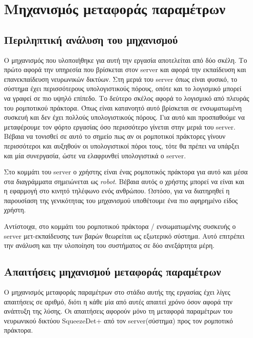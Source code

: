 \chapter{Μηχανισμός μεταφοράς παραμέτρων}


\section{Περιληπτική ανάλυση του μηχανισμού}
Ο μηχανισμός που υλοποιήθηκε για αυτή την εργασία αποτελείται από δύο σκέλη. Το πρώτο αφορά την υπηρεσία που βρίσκεται στον server και αφορά την εκπαίδευση και επανεκπαίδευση νευρωνικών δικτύων. Στη μεριά του server όπως είναι φυσικό, το σύστημα έχει περισσότερους υπολογιστικούς πόρους, οπότε και το λογισμικό μπορεί να γραφεί σε πιο υψηλό επίπεδο. Το δεύτερο σκέλος αφορά το λογισμικό από πλευράς του ρομποτικού πράκτορα. Όπως είναι κατανοητό αυτό βρίσκεται σε ενσωματωμένη συσκευή και δεν έχει πολλούς υπολογιστικούς πόρους. Για αυτό και προσπαθούμε να μεταφέρουμε τον φόρτο εργασίας όσο περισσότερο γίνεται στην μεριά του server. Βέβαια να τονισθεί σε αυτό το σημείο πως αν οι ρομποτικοί πράκτορες γίνουν περισσότεροι και αυξηθούν οι υπολογιστικοί πόροι τους, τότε θα πρέπει να υπάρξει και μία συνεργασία, ώστε να ελαφρυνθεί υπολογιστικά ο server.

Στο κομμάτι του server ο χρήστης είναι ένας ρομποτικός πράκτορα για αυτό και μέσα στα διαγράμματα σημειώνεται ως \textit{robot}. Βέβαια αυτός ο χρήστης μπορεί να είναι και η εφαρμογή στο κινητό τηλέφωνο ενός ανθρώπου. Ωστόσο, για να διατηρηθεί η παρουσίαση της γενικότητας του μηχανισμού υποθέτουμε ένα πιο αφηρημένο είδος χρήστη.

Αντίστοιχα, στο κομμάτι του ρομποτικού πράκτορα / ενσωματωμένης συσκευής ο server μετ-εκπαίδευσης των βαρών θεωρείται ως εξωτερικό σύστημα. Αυτό επιτρέπει την ανάλυση και την υλοποίηση του συστήματος σε δύο ανεξάρτητα μέρη.

\section{Απαιτήσεις μηχανισμού μεταφοράς παραμέτρων}
Ο μηχανισμός μεταφοράς παραμέτρων στο στάδιο αυτής της εργασίας έχει λίγες απαιτήσεις σε αριθμό, διότι η κάθε μία από αυτές απαιτεί χρόνο όσον αφορά την ανάπτυξη της λύσης. Οι απαιτήσεις αφορούν μόνο τη μεταφορά παραμέτρων του νευρωνικού δικτύου SqueezeDet+ από τον server(σύστημα) προς τον ρομποτικό πράκτορα.

